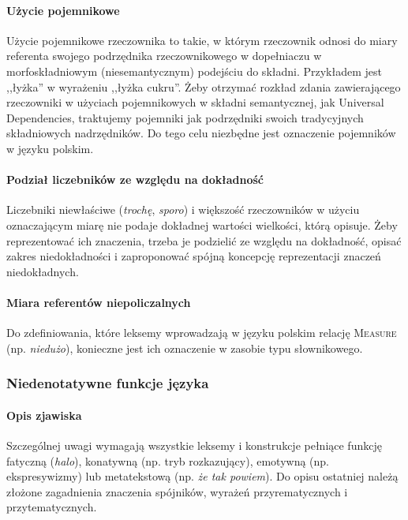 \documentclass[12pt]{mwart}
\theoremstyle{remark}
\begin{document}
\paragraph{Użycie pojemnikowe} %
\label{pojemniki}
Użycie pojemnikowe rzeczownika to takie, w którym rzeczownik odnosi do miary referenta swojego podrzędnika rzeczownikowego w dopełniaczu w morfoskładniowym (niesemantycznym) podejściu do składni. Przykładem jest ,,łyżka'' w wyrażeniu ,,łyżka cukru''.
Żeby otrzymać rozkład zdania zawierającego rzeczowniki w użyciach pojemnikowych w składni semantycznej, jak Universal Dependencies, traktujemy pojemniki jak podrzędniki swoich tradycyjnych składniowych nadrzędników. Do tego celu niezbędne jest oznaczenie pojemników w języku polskim.


\paragraph{Podział liczebników ze względu na dokładność} %

Liczebniki niewłaściwe (\emph{trochę}, \emph{sporo}) i większość rzeczowników w użyciu oznaczającym miarę nie podaje dokładnej wartości wielkości, którą opisuje. Żeby reprezentować ich znaczenia, trzeba je podzielić ze względu na dokładność, opisać zakres niedokładności i zaproponować spójną koncepcję reprezentacji znaczeń niedokładnych.


\paragraph{Miara referentów niepoliczalnych} %

Do zdefiniowania, które leksemy wprowadzają w języku polskim relację \textsc{Measure} (np. \emph{niedużo}), konieczne jest ich oznaczenie w zasobie typu słownikowego.



\subsubsection{Niedenotatywne funkcje języka} %
\paragraph{Opis zjawiska} %
\label{sub:opis_zjawiska2}
Szczególnej uwagi wymagają wszystkie leksemy i konstrukcje pełniące funkcję fatyczną (\emph{halo}), konatywną (np. tryb rozkazujący), emotywną (np. ekspresywizmy) lub metatekstową (np. \emph{że tak powiem}).
Do opisu ostatniej należą złożone zagadnienia znaczenia spójników, wyrażeń przyrematycznych i przytematycznych.
\end{document}
